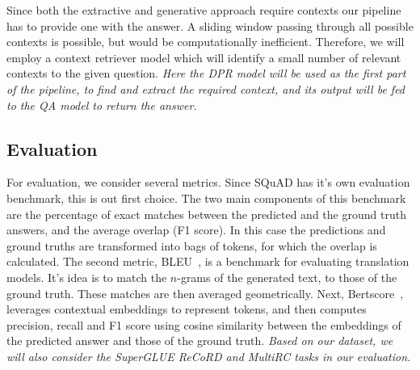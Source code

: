 \documentclass[fleqn,moreauthors,10pt]{ds_report}
\begin{document}
Since both the extractive and generative approach require contexts our pipeline has to provide one with the answer.
A sliding window passing through all possible contexts is possible, but would be computationally inefficient.
Therefore, we will employ a context retriever model which will identify a small number of relevant contexts to the given question.
{\it Here the DPR model will be used as the first part of the pipeline, to find and extract the required context, and its output will be fed to the QA model to return the answer.}

\subsection*{Evaluation}
For evaluation, we consider several metrics. Since SQuAD has it's own evaluation benchmark, this is out first choice. 
The two main components of this benchmark are the percentage of exact matches between the predicted and the ground truth answers, and the average overlap (F1 score). 
In this case the predictions and ground truths are transformed into bags of tokens, for which the overlap is calculated.
The second metric, BLEU~\cite{papineni2002bleu}, is a benchmark for evaluating translation models.
It's idea is to match the $n$-grams of the generated text, to those of the ground truth. These matches are then averaged geometrically.
Next, Bertscore~\cite{zhang2019bertscore}, leverages contextual embeddings to represent tokens, and then computes precision, recall and F1 score using cosine similarity between the embeddings of the predicted answer and those of the ground truth.
{\it Based on our dataset, we will also consider the SuperGLUE ReCoRD and MultiRC tasks in our evaluation.}






\end{document}
